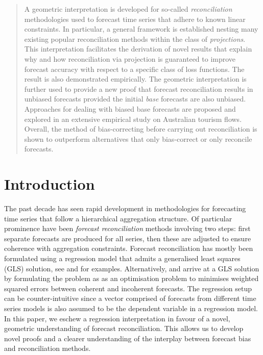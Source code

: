 \documentclass[12pt]{article}
\theoremstyle{definition}
\def\spacingset#1{\renewcommand{\baselinestretch}%
    {#1}\small\normalsize} \spacingset{1}
\begin{document}
\begin{abstract}
\spacingset{1.45}
  A geometric interpretation is developed for so-called \emph{reconciliation} methodologies used to forecast time series that adhere to known linear constraints. In particular, a general framework is established nesting many existing popular reconciliation methods within the class of \emph{projections}. This interpretation facilitates the derivation of novel results that explain why and how reconciliation via projection is guaranteed to improve forecast accuracy with respect to a specific class of loss functions. The result is also demonstrated empirically. The geometric interpretation is further used to provide a new proof that forecast reconciliation results in unbiased forecasts provided the initial \emph{base} forecasts are also unbiased. Approaches for dealing with biased base forecasts are proposed and explored in an extensive empirical study on Australian tourism flows. Overall, the method of bias-correcting before carrying out reconciliation is shown to outperform alternatives that only bias-correct or only reconcile forecasts.

\end{abstract}


\newpage
\spacingset{1.45} %

\section{Introduction}\label{sec:intro}

The past decade has seen rapid development in methodologies for forecasting time series that follow a hierarchical aggregation structure. Of particular prominence have been \emph{forecast reconciliation} methods involving two steps: first separate forecasts are produced for all series, then these are adjusted to ensure coherence with aggregation constraints. Forecast reconciliation has mostly been formulated using a regression model {\color{blue} that admits a generalised least squares (GLS) solution}, see \citet{Hyndman2011} and \citet{WicEtAl2019} for examples. {\color{blue} Alternatively, \cite{VanErven2015a} and \cite{NysEtAl2019} arrive at a GLS solution by formulating the problem as as an optimisation problem to minimises weighted squared errors between coherent and incoherent forecasts}.  The regression setup can be counter-intuitive since a vector comprised of forecasts from different time series models is also assumed to be the dependent variable in a regression model. In this paper, we eschew a regression interpretation in favour of a novel, geometric understanding of forecast reconciliation. This allows us to develop novel proofs and a clearer understanding of the interplay between forecast bias and reconciliation methods.
\end{document}
